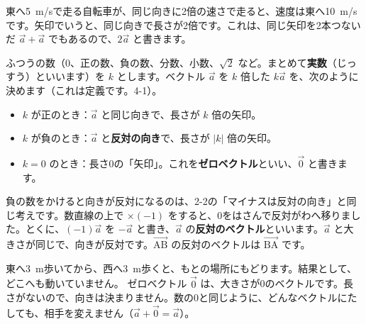 
\label{bk:4-10:jissubai}東へ\qty{5}{m/s}で走る自転車が、同じ向きに2倍の速さで走ると、速度は東へ\qty{10}{m/s}です。矢印でいうと、同じ向きで長さが2倍です。これは、同じ矢印を2本つないだ $\vec{a}+\vec{a}$ でもあるので、$2\vec{a}$ と書きます。

\begin{bkfigure}
\end{bkfigure}

ふつうの数（0、正の数、負の数、分数、小数、$\sqrt2$ など。まとめて\textbf{実数}（じっすう）といいます）を $k$ とします。ベクトル $\vec{a}$ を $k$ 倍した $k\vec{a}$ を、次のように決めます（これは定義です。4-1）。

\begin{itemize}[leftmargin=1.2\zw, itemsep=2pt, topsep=2pt, label={\color{\bkTT}●}]
\item $k$ が正のとき：$\vec{a}$ と同じ向きで、長さが $k$ 倍の矢印。
\item $k$ が負のとき：$\vec{a}$ と\textbf{反対の向き}で、長さが $|k|$ 倍の矢印。
\item $k=0$ のとき：長さ0の「矢印」。これを\textbf{ゼロベクトル}といい、$\vec{0}$ と書きます。
\end{itemize}

負の数をかけると向きが反対になるのは、2-2の「マイナスは反対の向き」と同じ考えです。数直線の上で $\times(-1)$ をすると、0をはさんで反対がわへ移りました。とくに、$(-1)\vec{a}$ を $-\vec{a}$ と書き、$\vec{a}$ の\textbf{反対のベクトル}といいます。$\vec{a}$ と大きさが同じで、向きが反対です。$\overrightarrow{\mathrm{AB}}$ の反対のベクトルは $\overrightarrow{\mathrm{BA}}$ です。

東へ\qty{3}{m}歩いてから、西へ\qty{3}{m}歩くと、もとの場所にもどります。結果として、どこへも動いていません。
ゼロベクトル $\vec{0}$ は、大きさが0のベクトルです。長さがないので、向きは決まりません。数の0と同じように、どんなベクトルにたしても、相手を変えません（$\vec{a}+\vec{0}=\vec{a}$）。

